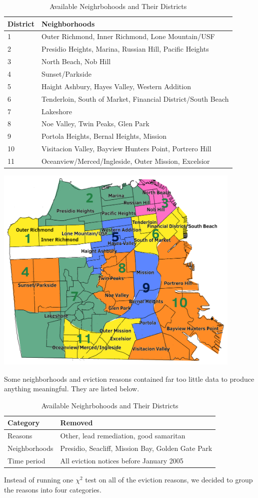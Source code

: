 \documentclass[]{article}
\begin{document}
\begin{table}[!h]
\begin{tabular}{l | l}
District & Neighborhoods \\
\hline
1 		 & Outer Richmond, Inner Richmond, Lone Mountain/USF \\
2		 & Presidio Heights, Marina, Russian Hill, Pacific Heights \\
3 		 & North Beach, Nob Hill \\
4		 & Sunset/Parkside \\
5		 & Haight Ashbury, Hayes Valley, Western Addition \\
6		 & Tenderloin, South of Market, Financial District/South Beach \\
7		 & Lakeshore \\
8 		 & Noe Valley, Twin Peaks, Glen Park \\
9		 & Portola Heights, Bernal Heights, Mission \\
10 		 & Visitacion Valley, Bayview Hunters Point, Portrero Hill \\
11		 & Oceanview/Merced/Ingleside, Outer Mission, Excelsior \\
\end{tabular}
\caption{Available Neighrbohoods and Their Districts}
\end{table}

\includegraphics[height=10cm]{legitmap}

Some neighborhoods and eviction reasons contained far too little data to produce anything meaningful. They are listed below.

\begin{table}[!h]
\begin{tabular}{l | l}
Category & Removed \\\hline
Reasons  & Other, lead remediation, good samaritan \\
Neighborhoods & Presidio, Seacliff, Mission Bay, Golden Gate Park \\
Time period & All eviction notices before January 2005 \\
\end{tabular}
\caption{Available Neighrbohoods and Their Districts}
\end{table}
\newpage
Instead of running one $\chi ^{2}$ test on all of the eviction reasons, we decided to group the reasons into four categories.
\end{document}

